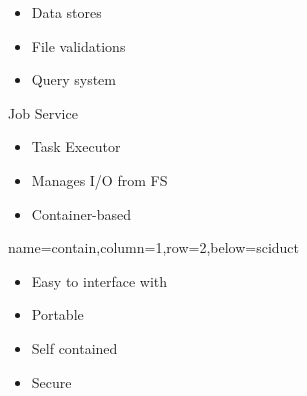 \documentclass[landscape,paperwidth=70in,paperheight=46in,fontscale=0.225]{baposter} %
\begin{document}
\begin{poster}
{\begin{minipage}[t]{0.32\columnwidth}
\small{\begin{itemize}[leftmargin=*,noitemsep,topsep=0pt]
	\item Data stores
	\item File validations
	\item Query system
\end{itemize}}

\end{minipage}
\hfill
\noindent
\begin{minipage}[t]{0.32\columnwidth}
Job Service
\small{\begin{itemize}[leftmargin=*,noitemsep,topsep=0pt]
	\item Task Executor
	\item Manages I/O from FS
	\item Container-based 

\end{itemize}}

\end{minipage}
}


          {name=contain,column=1,row=2,below=sciduct}{
          
\begin{minipage}{.5\textwidth}
\begin{itemize}[leftmargin=*,noitemsep,topsep=0pt]
\item Easy to interface with
\item Portable
\item Self contained
\item Secure


\end{itemize}
\end{minipage}}
\end{poster}
\end{document}
